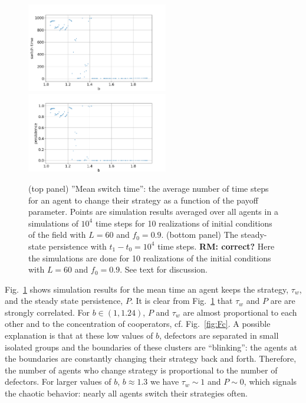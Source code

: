 \documentclass[a4paper]{jpconf}
\begin{document}
\begin{figure}[H]
\begin{center}
	\includegraphics[width=0.55\textwidth, keepaspectratio=True]{Change_time.png} \\
%
	\includegraphics[width=0.55\textwidth, keepaspectratio=True]{Persistence.png}
	\caption{(top panel) ''Mean switch time'': the average number of time steps for an agent to change their strategy as a function of the payoff parameter.  
	Points are simulation results averaged over all agents in a simulations of $10^{4}$ time steps for 10 realizations of initial conditions of the field with $L=60$ and $f_0 = 0.9$.
	(bottom panel) The steady-state persistence with $t_1 - t_0 = 10^4$ time steps. 
	 \textbf{RM: correct?} Here the simulations are done for 10 realizations of the initial conditions with $L=60$ and $f_0 = 0.9$. See text for discussion.
	}
	\label{fig:persistence}
\end{center}
\end{figure}


Fig.\ \ref{fig:persistence} shows simulation results for the mean time an agent keeps the strategy, $\tau_w$, and the steady state persistence, $P$. It is clear from Fig.\ \ref{fig:persistence} that $\tau_w$ and $P$ are
are strongly correlated. For $b\in(1, 1.24)$,  $P$ and $\tau_w$ are almost proportional to each other and to the concentration of cooperators, cf. Fig.\ \ref{fig:Fc}. 
A possible explanation is that at these low values of $b$, defectors are separated in small isolated groups
and the boundaries of these clusters are ``blinking'': the agents at the boundaries are constantly changing their strategy back and forth. Therefore, the number of agents who change strategy is proportional to the number of defectors.  
For larger values of $b$, $b \approx 1.3$ we have $\tau_w \sim 1$ and $P\sim 0$, which signals the chaotic behavior: nearly all agents switch their strategies often. 
\end{document}
